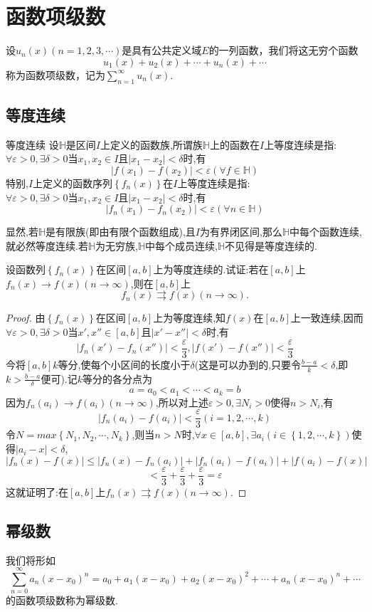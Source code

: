 \chapter{函数项级数}

\begin{definition}
	设$u_n(x)(n=1,2,3,\cdots)$是具有公共定义域$E$的一列函数，我们将这无穷个函数$$u_1(x)+u_2(x)+\cdots+u_n(x)+\cdots$$称为函数项级数，记为$\sum_{n=1}^{\infty}{u_n\left( x \right)}$.
\end{definition}

\section{等度连续}

\begin{definition}{等度连续}
	设$\mathbb{H}$是区间$I$上定义的函数族,所谓族$\mathbb{H}$上的函数在$I$上等度连续是指:\\
	$
		\forall \varepsilon >0,\exists \delta >0
	$当$x_1,x_2\in I$且$|x_1 -x_2|<\delta$时,有
	$$|f(x_1)-f(x_2)|<\varepsilon  (\forall f\in\mathbb{H})$$
	特别,$I$上定义的函数序列$\left\lbrace  f_n (x) \right\rbrace $在$I$上等度连续是指:\\
	$
		\forall \varepsilon >0,\exists \delta >0
	$当$x_1,x_2\in I$且$|x_1 -x_2|<\delta$时,有
	$$|f_n (x_1)-f_n (x_2)|<\varepsilon  (\forall n\in\mathbb{H})$$
\end{definition}

显然,若$\mathbb{H}$是有限族(即由有限个函数组成),且$I$为有界闭区间,那么$\mathbb{H}$中每个函数连续,就必然等度连续.若$\mathbb{H}$为无穷族,$\mathbb{H}$中每个成员连续,$\mathbb{H}$不见得是等度连续的.

\begin{example}
	设函数列$\left\lbrace f_n(x) \right\rbrace $在区间$[a,b]$上为等度连续的.试证:若在$[a,b]$上$f_n(x)\rightarrow f(x)(n\rightarrow \infty)$,则在$[a,b]$上
	$$f_n(x)\rightrightarrows f(x) (n\rightarrow \infty).$$
\end{example}

\begin{proof}
	由$\left\lbrace f_n(x) \right\rbrace $在区间$[a,b]$上为等度连续,知$f(x)$在$[a,b]$上一致连续,因而$
		\forall \varepsilon >0,\exists \delta >0
	$当$x',x''\in [a,b]$且$|x' -x''|<\delta$时,有
	$$|f_n(x')-f_n(x'')|<\frac{\varepsilon}{3}, |f(x')-f(x'')|<\frac{\varepsilon}{3}$$
	今将$[a,b]k$等分,使每个小区间的长度小于$\delta$(这是可以办到的,只要令$\frac{b-a}{k}<\delta$,即$k>\frac{b-a}{\delta}$便可).记$k$等分的各分点为
	$$a=a_0<a_1<\cdots <a_k=b$$
	因为$f_n(a_i) \rightarrow f(a_i)(n\rightarrow \infty)$,所以对上述$
		\varepsilon >0,\exists N_i >0
	$使得$n>N_i$,有
	$$|f_n(a_i)-f(a_i)|<\frac{\varepsilon}{3}(i=1,2,\cdots,k)$$
	令$N=max\left\lbrace N_1,N_2,\cdots,N_k \right\rbrace $,则当$n>N$时,$\forall x \in [a,b], \exists a_i(i\in\left\lbrace 1,2,\cdots,k \right\rbrace )$使得$|a_i-x|<\delta$,
	$$|f_n(x)-f(x)|\le |f_n(x)-f_n(a_i)|+|f_n(a_i)-f(a_i)|+|f(a_i)-f(x)|$$
	$$<\frac{\varepsilon}{3}+\frac{\varepsilon}{3}+\frac{\varepsilon}{3}=\varepsilon$$
	这就证明了:在$[a,b]$上$f_n(x)\rightrightarrows f(x) (n\rightarrow \infty).$
\end{proof}

\section{幂级数}

我们将形如$$
\sum_{n=0}^{\infty}{a_n\left( x-x_0 \right) ^n}=a_0+a_1\left( x-x_0 \right) +a_2\left( x-x_0 \right) ^2+\cdots +a_n\left( x-x_0 \right) ^n+\cdots 
$$的函数项级数称为幂级数.
